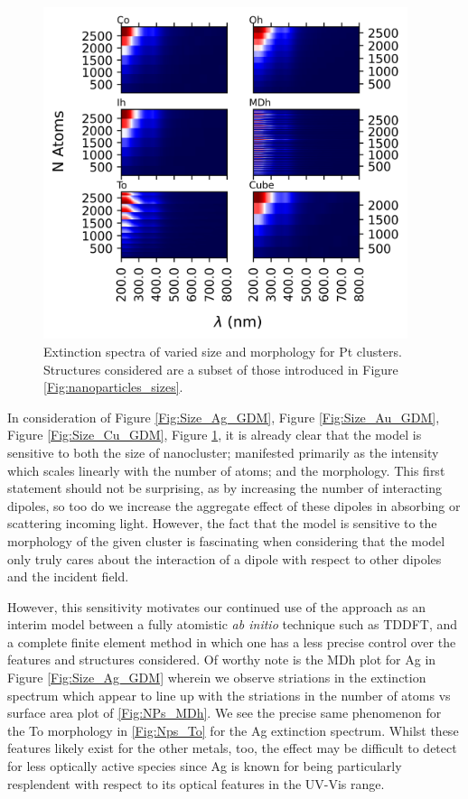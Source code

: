 \begin{figure}[b]
    \includegraphics[width=0.95\textwidth]{figures/LM/GDM/Pt_Specs.png}
    \caption{Extinction spectra of varied size and morphology for Pt clusters. Structures considered are a subset of those introduced in Figure \ref{Fig:nanoparticles_sizes}.}
    \label{Fig:Size_Pt_GDM}
\end{figure}

In consideration of Figure \ref{Fig:Size_Ag_GDM}, Figure \ref{Fig:Size_Au_GDM}, Figure \ref{Fig:Size_Cu_GDM}, Figure \ref{Fig:Size_Pt_GDM}, it is already clear that the model is sensitive to both the size of nanocluster; manifested primarily as the intensity which scales linearly with the number of atoms; and the morphology. This first statement should not be surprising, as by increasing the number of interacting dipoles, so too do we increase the aggregate effect of these dipoles in absorbing or scattering incoming light. However, the fact that the model is sensitive to the morphology of the given cluster is fascinating when considering that the model only truly cares about the interaction of a dipole with respect to other dipoles and the incident field.

However, this sensitivity motivates our continued use of the approach as an interim model between a fully atomistic \textit{ab initio} technique such as TDDFT, and a complete finite element method in which one has a less precise control over the features and structures considered. Of worthy note is the MDh plot for Ag in Figure \ref{Fig:Size_Ag_GDM} wherein we observe striations in the extinction spectrum which appear to line up with the striations in the number of atoms vs surface area plot of \ref{Fig:NPs_MDh}. We see the precise same phenomenon for the To morphology in \ref{Fig:Nps_To} for the Ag extinction spectrum. Whilst these features likely exist for the other metals, too, the effect may be difficult to detect for less optically active species since Ag is known for being particularly resplendent with respect to its optical features in the UV-Vis range.

